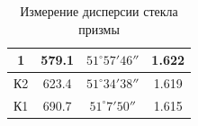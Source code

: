 \begin{table}[h]
\begin{tabular}{|c|c|c|c|}
1                                                              & 579.1                                                                        & $51^\circ57'46''$                                                                                      & 1.622                                                                           \\ \hline
К2                                                             & 623.4                                                                        & $51^\circ34'38''$                                                                                      & 1.619                                                                           \\ \hline
К1                                                             & 690.7                                                                        & $51^\circ7'50''$                                                                                       & 1.615                                                                           \\ \hline
\end{tabular}
\caption{Измерение дисперсии стекла призмы}
\label{tab:disp}
\end{table}